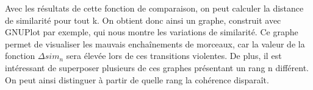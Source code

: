 Avec les résultats de cette fonction de comparaison, on peut calculer la
distance de similarité pour tout k. On obtient donc ainsi un graphe, construit
avec GNUPlot par exemple, qui nous montre les variations de similarité. Ce
graphe permet de visualiser les mauvais enchaînements de morceaux, car la valeur
de la fonction $\Delta{}sim_{n}$ sera élevée lors de ces transitions violentes.
De plus, il est intéressant de superposer plusieurs de ces graphes présentant un
rang n différent. On peut ainsi distinguer à partir de quelle rang la cohérence
disparaît.
